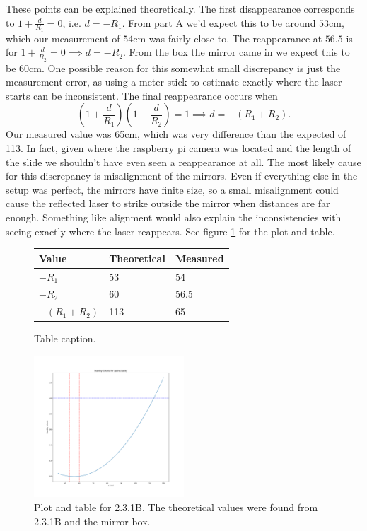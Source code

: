 \documentclass[letterpaper, reqno,11pt]{article}
\begin{document}
These points can be explained theoretically. The first disappearance corresponds to $1+\frac{d}{R_1}=0$, i.e. $d=-R_1$. From part A we'd expect this to be around $53$cm, which our measurement of $54$cm was fairly close to. The reappearance at $56.5$ is for $1+\frac{d}{R_2}=0\implies d=-R_2$. From the box the mirror came in we expect this to be $60$cm. One possible reason for this somewhat small discrepancy is just the measurement error, as using a meter stick to estimate exactly where the laser starts can be inconsistent. The final reappearance occurs when
\[
\left(1+ \frac{d}{R_1}\right) \left( 1+ \frac{d}{R_2} \right) = 1\implies d=-(R_1+R_2)
.\]
Our measured value was 65cm, which was very difference than the expected of 113. In fact, given where the raspberry pi camera was located and the length of the slide we shouldn't have even seen a reappearance at all. The most likely cause for this discrepancy is misalignment of the mirrors. Even if everything else in the setup was perfect, the mirrors have finite size, so a small misalignment could cause the reflected laser to strike outside the mirror when distances are far enough. Something like alignment would also explain the inconsistencies with seeing exactly where the laser reappears. See figure \ref{fig:1A} for the plot and table.

\begin{figure}[tb]
    \centering
    \begin{minipage}[b]{0.45\textwidth}
    \begin{tabular}{|l|l|l|}
    \hline
    Value & Theoretical & Measured \\
    \hline
    $-R_1$ & 53 & 54 \\
    $-R_2$ & 60 & 56.5 \\
    $-(R_1+R_2)$ & 113 & 65 \\
    \hline
    \end{tabular}
    \caption{Table caption.}
    \label{fig:table1}
    \end{minipage}
    \hfill
    \includegraphics[width=0.5\textwidth]{1B}
    \caption{Plot and table for 2.3.1B. The theoretical values were found from 2.3.1B and the mirror box.}
    \label{fig:1A}
\end{figure}
\end{document}
